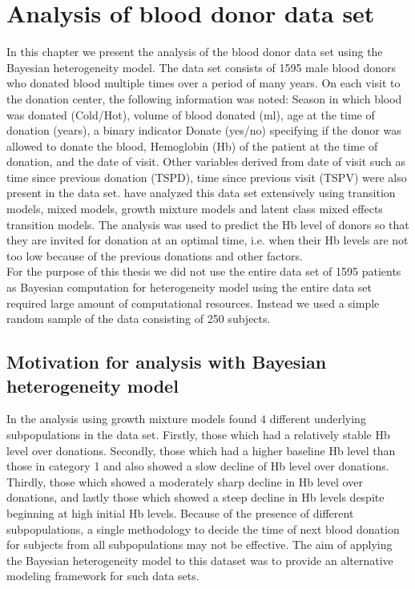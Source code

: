 
\chapter{Analysis of blood donor data set}
\label{ch : blood_donor}
 
 In this chapter we present the analysis of the blood donor data set \citep{nasserinejad_prevalence_2015} using the Bayesian heterogeneity model. The data set consists of 1595 male blood donors who donated blood multiple times over a period of many years. On each visit to the donation center, the following information was noted: Season in which blood was donated (Cold/Hot), volume of blood donated (ml), age at the time of donation (years), a binary indicator Donate (yes/no) specifying if the donor was allowed to donate the blood, Hemoglobin (Hb) of the patient at the time of donation, and the date of visit. Other variables derived from date of visit such as time since previous donation (TSPD), time since previous visit (TSPV) were also present in the data set. \citet{nasserinejad_predicting_2013,nasserinejad_prevalence_2015,nasserinejad_prediction_2016} have analyzed this data set extensively using transition models, mixed models, growth mixture models and latent class mixed effects transition models. The analysis was used to predict the Hb level of donors so that they are invited for donation at an optimal time, i.e. when their Hb levels are not too low because of the previous donations and other factors.\\

 For the purpose of this thesis we did not use the entire data set of 1595 patients as Bayesian computation for heterogeneity model using the entire data set required large amount of computational resources. Instead we used a simple random sample of the data consisting of 250 subjects.

\section{Motivation for analysis with Bayesian heterogeneity model}
 In the analysis using growth mixture models \citet{nasserinejad_prevalence_2015} found 4 different underlying subpopulations in the data set. Firstly, those which had a relatively stable Hb level over donations. Secondly, those which had a higher baseline Hb level than those in category 1 and also showed a slow decline of Hb level over donations. Thirdly, those which showed a moderately sharp decline in Hb level over donations, and lastly those which showed a steep decline in Hb levels despite beginning at high initial Hb levels. Because of the presence of different subpopulations, a single methodology to decide the time of next blood donation for subjects from all subpopulations may not be effective. The aim of applying the Bayesian heterogeneity model to this dataset was to provide an alternative modeling framework for such data sets.

